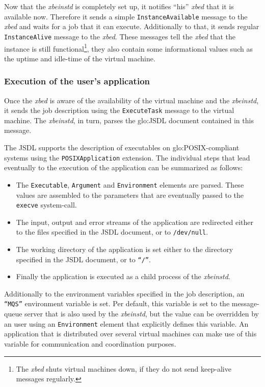Now that  the \emph{xbeinstd}  is completely set  up, it  notifies ``his''
\emph{xbed}  that  it  is  available  now. Therefore  it  sends  a  simple
\texttt{InstanceAvailable} message to the  \emph{xbed} and waits for a job
that   it  can   execute.   Additionally   to  that,   it   sends  regular
\texttt{InstanceAlive} message to the \emph{xbed}. These messages tell the
\emph{xbed} that the instance is still functional\footnote{The \emph{xbed}
  shuts virtual  machines down,  if they do  not send  keep-alive messages
  regularly.},  they also contain  some informational  values such  as the
uptime and idle-time of the virtual machine.

\subsubsection{Execution of the user's application}

Once the \emph{xbed}  is aware of the availability  of the virtual machine
and  the   \emph{xbeinstd},  it  sends  the  job   description  using  the
\texttt{ExecuteTask} message to  the virtual machine. The \emph{xbeinstd},
in turn, parses the \gls{glo:JSDL} document contained in this message.

The    JSDL     supports    the    description     of    executables    on
\gls{glo:POSIX}-compliant  systems  using the  \texttt{POSIX\-Application}
extension. The individual  steps that lead eventually to  the execution of
the application can be summarized as follows:

\begin{itemize}
\item The  \texttt{Executable}, \texttt{Argument} and \texttt{Environment}
  elements are parsed.  These values are assembled to  the parameters that
  are eventually passed to the \texttt{execve} system-call.
\item  The  input,  output  and  error  streams  of  the  application  are
  redirected  either to the  files specified  in the  JSDL document,  or to
  \texttt{/dev/null}.
\item  The working  directory  of the  application  is set  either to  the
  directory specified in the JSDL document, or to \texttt{``/''}.
\item  Finally the  application  is executed  as  a child  process of  the
  \emph{xbeinstd}.
\end{itemize}

Additionally   to  the   environment  variables   specified  in   the  job
description,  an  \texttt{``MQS''}   environment  variable  is  set.   Per
default, this  variable is  set to the  message-queue server that  is also
used by  the \emph{xbeinstd}, but the  value can be overridden  by an user
using  an  \texttt{Environment}   element  that  explicitly  defines  this
variable.   An  application  that  is  distributed  over  several  virtual
machines can make use of  this variable for communication and coordination
purposes.

